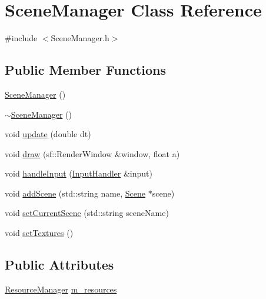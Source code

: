 \hypertarget{class_scene_manager}{}\section{Scene\+Manager Class Reference}
\label{class_scene_manager}


{\ttfamily \#include $<$Scene\+Manager.\+h$>$}

\subsection*{Public Member Functions}
\begin{DoxyCompactItemize}
\item 
\mbox{\hyperlink{class_scene_manager_a52085e6737c23b491c228e86781af808}{Scene\+Manager}} ()
\item 
\mbox{\hyperlink{class_scene_manager_a2bb376a85d29e85f47753e26c7539229}{$\sim$\+Scene\+Manager}} ()
\item 
void \mbox{\hyperlink{class_scene_manager_ac919b175f2a4b00c4f69e40ab43b1468}{update}} (double dt)
\item 
void \mbox{\hyperlink{class_scene_manager_aeae169a2ae06250127fe6ff28cdbeebe}{draw}} (sf\+::\+Render\+Window \&window, float a)
\item 
void \mbox{\hyperlink{class_scene_manager_a404e7ccdd4fe5f8eef2348d7557a4805}{handle\+Input}} (\mbox{\hyperlink{class_input_handler}{Input\+Handler}} \&input)
\item 
void \mbox{\hyperlink{class_scene_manager_acb8e176697ea223d4fd8c2718056206e}{add\+Scene}} (std\+::string name, \mbox{\hyperlink{class_scene}{Scene}} $\ast$scene)
\item 
void \mbox{\hyperlink{class_scene_manager_ab56b68e45ceb0feec829c0a070da1ab7}{set\+Current\+Scene}} (std\+::string scene\+Name)
\item 
void \mbox{\hyperlink{class_scene_manager_a8deb97f7f4c212314c66b96baf325cf5}{set\+Textures}} ()
\end{DoxyCompactItemize}
\subsection*{Public Attributes}
\begin{DoxyCompactItemize}
\item 
\mbox{\hyperlink{class_resource_manager}{Resource\+Manager}} \mbox{\hyperlink{class_scene_manager_a27175bd685421567da69acbd44484e73}{m\+\_\+resources}}
\end{DoxyCompactItemize}


